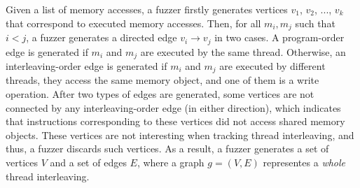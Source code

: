 Given a list of memory accesses, a fuzzer firstly generates vertices
$v_1$, $v_2$, ..., $v_k$ that correspond to executed memory accesses.
%
Then, for all $m_i, m_j$ such that $i<j$, a fuzzer generates a
directed edge $v_i \rightarrow v_j$ in two cases. A program-order edge
is generated if $m_i$ and $m_j$ are executed by the same thread.
%
Otherwise, an interleaving-order edge is generated if $m_i$ and $m_j$
are executed by different threads, they access the same memory object,
and one of them is a write operation.
%
After two types of edges are generated, some vertices are not
connected by any interleaving-order edge (in either direction), which
indicates that instructions corresponding to these vertices did not
access shared memory objects. These vertices are not interesting when
tracking thread interleaving, and thus, a fuzzer discards such
vertices.
%
As a result, a fuzzer generates a set of vertices $V$ and a set of
edges $E$, where a graph $g = (V, E)$ representes a \textit{whole}
thread interleaving.









